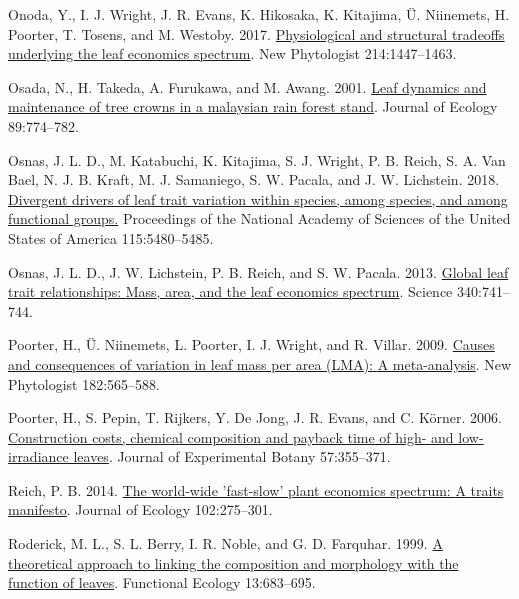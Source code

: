 \documentclass[
  12pt,
]{article}
\begin{document}
\begin{CSLReferences}{1}{0}
\leavevmode{}%
Onoda, Y., I. J. Wright, J. R. Evans, K. Hikosaka, K. Kitajima, Ü. Niinemets, H. Poorter, T. Tosens, and M. Westoby. 2017. \href{https://doi.org/10.1111/nph.14496}{Physiological and structural tradeoffs underlying the leaf economics spectrum}. New Phytologist 214:1447--1463.

\leavevmode{}%
Osada, N., H. Takeda, A. Furukawa, and M. Awang. 2001. \href{https://doi.org/10.1046/j.0022-0477.2001.00590.x}{Leaf dynamics and maintenance of tree crowns in a malaysian rain forest stand}. Journal of Ecology 89:774--782.

\leavevmode{}%
Osnas, J. L. D., M. Katabuchi, K. Kitajima, S. J. Wright, P. B. Reich, S. A. Van Bael, N. J. B. Kraft, M. J. Samaniego, S. W. Pacala, and J. W. Lichstein. 2018. \href{https://doi.org/10.1073/pnas.1803989115}{Divergent drivers of leaf trait variation within species, among species, and among functional groups.} Proceedings of the National Academy of Sciences of the United States of America 115:5480--5485.

\leavevmode{}%
Osnas, J. L. D., J. W. Lichstein, P. B. Reich, and S. W. Pacala. 2013. \href{https://doi.org/10.1126/science.1231574}{Global leaf trait relationships: {Mass}, area, and the leaf economics spectrum}. Science 340:741--744.

\leavevmode{}%
Poorter, H., Ü. Niinemets, L. Poorter, I. J. Wright, and R. Villar. 2009. \href{https://doi.org/10.1111/j.1469-8137.2009.02830.x}{Causes and consequences of variation in leaf mass per area ({LMA}): {A} meta-analysis}. New Phytologist 182:565--588.

\leavevmode{}%
Poorter, H., S. Pepin, T. Rijkers, Y. De Jong, J. R. Evans, and C. Körner. 2006. \href{https://doi.org/10.1093/jxb/erj002}{Construction costs, chemical composition and payback time of high- and low-irradiance leaves}. Journal of Experimental Botany 57:355--371.

\leavevmode{}%
Reich, P. B. 2014. \href{https://doi.org/10.1111/1365-2745.12211}{The world-wide 'fast-slow' plant economics spectrum: {A} traits manifesto}. Journal of Ecology 102:275--301.

\leavevmode{}%
Roderick, M. L., S. L. Berry, I. R. Noble, and G. D. Farquhar. 1999. \href{https://doi.org/10.1046/j.1365-2435.1999.00368.x}{A theoretical approach to linking the composition and morphology with the function of leaves}. Functional Ecology 13:683--695.


\end{CSLReferences}
\end{document}
